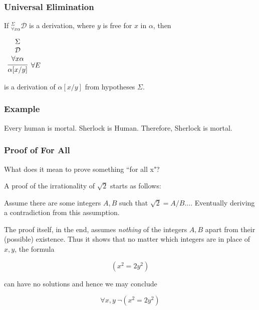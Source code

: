 \documentclass{beamer}
\theoremstyle{indentDefn} \newtheorem{defn}[]{Definition}
\begin{document}
\begin{frame}
	\frametitle{Universal Elimination}
	
	If $^{\Sigma}_{\forall x \alpha}\mathcal{D}$ is a derivation, where $y$ is free for $x$ in $\alpha$, then
	
	\vspace{0.5cm}
	
	\begin{center}
		$\begin{array}{c}
		\infer[\forall E]{\alpha[x/y]}{\begin{array}{c} 
			\Sigma \\
			\mathcal{D} \\ 
			\forall x \alpha			
			\end{array}}
		\end{array}$
	\end{center}
	
	is a derivation of $\alpha[x/y]$ from hypotheses $\Sigma$. 
	
\end{frame}

\begin{frame}
	\frametitle{Example}
	
	Every human is mortal. Sherlock is Human. Therefore, Sherlock is mortal. 
	
	\vspace{6cm}
	
\end{frame}

\begin{frame}
	\frametitle{Proof of For All}
	
	What does it mean to prove something ``for all x"?
	
	\vspace{0.5cm} 
	
	A proof of the irrationality of $\sqrt{2}$ starts as follows: 
	
	\vspace{0.2cm}
	
	\begin{center}
		Assume there are some integers $A,B$ such that $\sqrt{2} = A/B$.... Eventually deriving a contradiction from this assumption.
	\end{center}
	
	The proof itself, in the end, assumes \emph{nothing} of the integers $A,B$ apart from their (possible) existence. Thus it shows that no matter which integers are in place of $x,y$, the formula 
	
	$$(x^{2} = 2y^{2})$$
	
	can have no solutions and hence we may conclude 
	
	$$\forall x,y \ \lnot (x^{2} = 2y^{2})$$
	
\end{frame}
\end{document}
